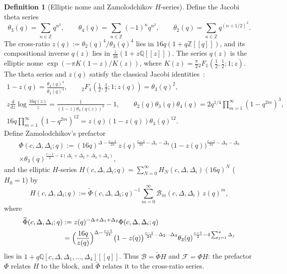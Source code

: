 \documentclass[twoside,10pt]{article}
\numberwithin{equation}{section}
\theoremstyle{slbody}
\theoremstyle{definition}
\newtheorem{definition}[theorem]{Definition}
\theoremstyle{remark}
\begin{document}
\begin{definition}[Elliptic nome and Zamolodchikov \(H\)-series]\label{def:H-series}
Define the Jacobi theta series
\[
 \theta_3(q)=\sum_{n\in\mathbb Z}q^{n^2},\qquad
 \theta_4(q)=\sum_{n\in\mathbb Z}(-1)^n q^{n^2},\qquad
 \theta_2(q)=\sum_{n\in\mathbb Z}q^{(n+1/2)^2}.
\]
The cross-ratio \(z(q):=\theta_2(q)^4/\theta_3(q)^4\) lies in
\(16q(1+q\mathbb Z[[q]])\), and its compositional inverse \(q(z)\) lies in
\(\frac{z}{16}(1+z\mathbb Q[[z]])\).  The series \(q(z)\) is the elliptic nome
\(\exp(-\pi K(1-z)/K(z))\), where
\(K(z)=\frac\pi2{}_2F_1(\tfrac12,\tfrac12;1;z)\).  The theta series and
\(z(q)\) satisfy the classical Jacobi
identities~\cite[\S\S21.2--21.61, 22.3--22.302]{WhittakerWatson1927}:
\begin{gather}
 1-z(q)=\frac{\theta_4(q)^4}{\theta_3(q)^4},\qquad
 {}_2F_1\!\left(\tfrac12,\tfrac12;1;z(q)\right)=\theta_3(q)^2,
 \label{eq:jacobi-1}\\
 z\frac{d}{dz}\log\frac{16q(z)}{z}=\frac{1}{(1-z)\theta_3(q(z))^4}-1,\qquad
 \theta_2(q)\theta_3(q)\theta_4(q)=2q^{1/4}\prod_{m=1}^\infty(1-q^{2m})^3,
 \label{eq:jacobi-2}\\
 16q\prod_{m=1}^\infty(1-q^{2m})^{12}=z(q)(1-z(q))\theta_3(q)^{12}.
 \label{eq:jacobi-3}
\end{gather}
Define Zamolodchikov's prefactor~\cite[\S3, the formula after (18)]{Zamolodchikov1987}
\begin{multline}\label{eq:Phi-def}
 \Phi(c,\Delta,\Delta_i;q)
 :=(16q)^{\Delta-\frac{c-1}{24}}\,
   z(q)^{\frac{c-1}{24}-\Delta_1-\Delta_2}\,
   \bigl(1-z(q)\bigr)^{\frac{c-1}{24}-\Delta_2-\Delta_3}\\
   \times\theta_3(q)^{\frac{c-1}{2}-4(\Delta_1+\Delta_2+\Delta_3+\Delta_4)},
\end{multline}
and the elliptic \(H\)-series
\(H(c,\Delta,\Delta_i;q)=\sum_{N=0}^\infty H_N(c,\Delta,\Delta_i)(16q)^N\)
(\(H_0=1\)) by
\begin{equation}\label{eq:H-def}
 H(c,\Delta,\Delta_i;q)
 :=\widetilde\Phi(c,\Delta,\Delta_i;q)^{-1}
   \sum_{m=0}^\infty\mathcal B_m(c,\Delta,\Delta_i)\,z(q)^m,
\end{equation}
where
\begin{align*}
 \widetilde\Phi(c,\Delta,\Delta_i;q)
 &:=z(q)^{-\Delta+\Delta_1+\Delta_2}\Phi(c,\Delta,\Delta_i;q)\\
 &=\Bigl(\frac{16q}{z(q)}\Bigr)^{\Delta-\frac{c-1}{24}}
  \bigl(1-z(q)\bigr)^{\frac{c-1}{24}-\Delta_2-\Delta_3}
  \theta_3(q)^{\frac{c-1}{2}-4\sum_{j=1}^4\Delta_j}
\end{align*}
lies in \(1+q\mathbb Q[c,\Delta,\Delta_1,\dots,\Delta_4][[q]]\).  Thus
\(\mathcal B=\widetilde\Phi H\) and \(\mathcal F=\Phi H\): the prefactor
\(\Phi\) relates \(H\) to the block, and \(\widetilde\Phi\) relates it to the
cross-ratio series.
\end{definition}
\end{document}
